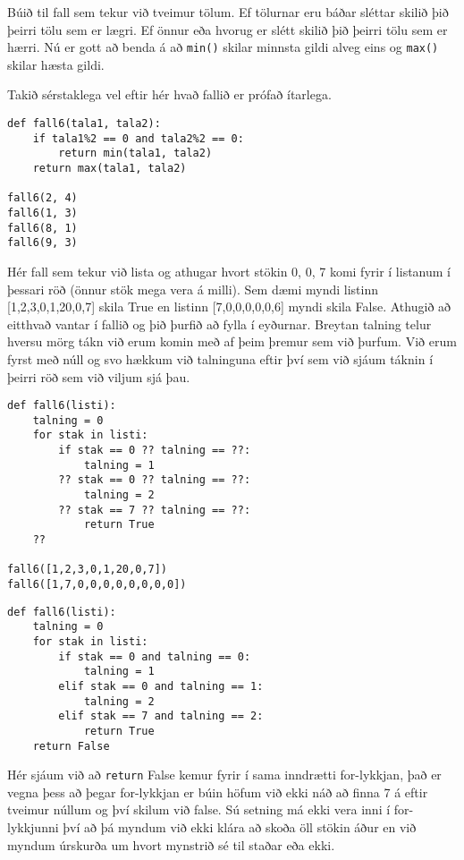 \begin{exercise}\label{fun6}
Búið til fall sem tekur við tveimur tölum.
Ef tölurnar eru báðar sléttar skilið þið þeirri tölu sem er lægri.
Ef önnur eða hvorug er slétt skilið þið þeirri tölu sem er hærri.
Nú er gott að benda á að \texttt{min()} skilar minnsta gildi alveg eins og \texttt{max()} skilar hæsta gildi.
\end{exercise}
\begin{Answer}[ref={fun6}]
	Takið sérstaklega vel eftir hér hvað fallið er prófað ítarlega.
	\begin{lstlisting}
def fall6(tala1, tala2):
	if tala1%2 == 0 and tala2%2 == 0:
		return min(tala1, tala2)
	return max(tala1, tala2)

fall6(2, 4)
fall6(1, 3)
fall6(8, 1)
fall6(9, 3)\end{lstlisting}

\end{Answer}


\begin{exercise}\label{fun7}
Hér fall sem tekur við lista og athugar hvort stökin 0, 0, 7 komi fyrir í listanum í þessari röð (önnur stök mega vera á milli).
Sem dæmi myndi listinn [1,2,3,0,1,20,0,7] skila True en listinn [7,0,0,0,0,0,6] myndi skila False.
Athugið að eitthvað vantar í fallið og þið þurfið að fylla í eyðurnar.
Breytan talning telur hversu mörg tákn við erum komin með af þeim þremur sem við þurfum.
Við erum fyrst með núll og svo hækkum við talninguna eftir því sem við sjáum táknin í þeirri röð sem við viljum sjá þau.
\begin{lstlisting}
def fall6(listi):
	talning = 0
	for stak in listi:
		if stak == 0 ?? talning == ??:
			talning = 1
		?? stak == 0 ?? talning == ??:
			talning = 2
		?? stak == 7 ?? talning == ??:
			return True
	??

fall6([1,2,3,0,1,20,0,7])
fall6([1,7,0,0,0,0,0,0,0,0])
\end{lstlisting}
\end{exercise}
\begin{Answer}[ref={fun7}]

	\begin{lstlisting}
def fall6(listi):
	talning = 0
	for stak in listi:
		if stak == 0 and talning == 0:
			talning = 1
		elif stak == 0 and talning == 1:
			talning = 2
		elif stak == 7 and talning == 2:
			return True
	return False\end{lstlisting}
	Hér sjáum við að \texttt{return} False kemur fyrir í sama inndrætti for-lykkjan, það er vegna þess að þegar for-lykkjan er búin höfum við ekki náð að finna 7 á eftir tveimur núllum og því skilum við false.
	Sú setning má ekki vera inni í for-lykkjunni því að þá myndum við ekki klára að skoða öll stökin áður en við myndum úrskurða um hvort mynstrið sé til staðar eða ekki.
	
\end{Answer}

